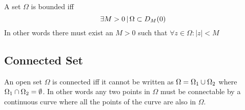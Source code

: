 \documentclass{article}
\begin{document}
A set \(\Omega\) is bounded iff
\[
    \exists M>0 \,|\, \Omega \subset D_M(0)
\]
In other words there must exist an \(M>0\) such that \(\forall z\in \Omega:|z|<M\)

\subsection{Connected Set}

An open set \(\Omega\) is connected iff it cannot be written as
\(\Omega=\Omega_1 \cup \Omega_2\) where \(\Omega_1 \cap \Omega_2 = \emptyset\).
In other words any two points in \(\Omega\) must be connectable by a continuous
curve where all the points of the curve are also in \(\Omega\).

\end{document}
